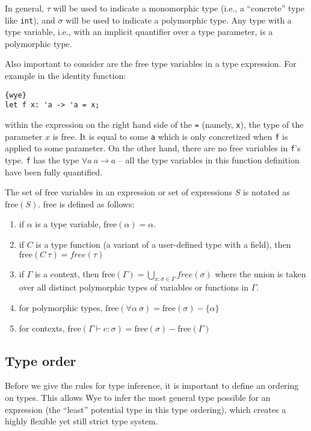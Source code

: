 \documentclass[a4paper, 12pt]{article}
\newcommand{\free}{\text{free}}
\begin{document}
In general, $\tau$ will be used to indicate a monomorphic type (i.e., a ``concrete'' type like \texttt{int}), and $\sigma$ will be used to indicate a polymorphic type. Any type with a type variable, i.e., with an implicit quantifier over a type parameter, is a polymorphic type.

Also important to consider are the free type variables in a type expression. For example in the identity function:
\begin{lstlisting}{wye}
let f x: 'a -> 'a = x;
\end{lstlisting}
within the expression on the right hand side of the \texttt{=} (namely, \texttt{x}), the type of the parameter $x$ is free. It is equal to some \texttt{a} which is only concretized when \texttt{f} is applied to some parameter. On the other hand, there are no free variables in \texttt{f}'s type. \texttt{f} has the type $\forall a\: a\to a$ -- all the type variables in this function definition have been fully quantified.

The set of free variables in an expression or set of expressions $S$ is notated as $\free(S)$. free is defined as follows:
\begin{enumerate}
\item if $\alpha$ is a type variable, $\free(\alpha) = \alpha$.
\item if $C$ is a type function (a variant of a user-defined type with a field), then $\free(C\: \tau) = free(\tau)$
\item if $\Gamma$ is a context, then $\free(\Gamma) = \bigcup_{x : \sigma\in\Gamma }free(\sigma)$ where the union is taken over all distinct polymorphic types of variables or functions in $\Gamma$.
\item for polymorphic types, $\free(\forall \alpha \: \sigma) = \free(\sigma) - \{\alpha\}$
\item for contexts, $\free(\Gamma\vdash e: \sigma) = \free(\sigma) - \free(\Gamma)$
\end{enumerate}

\subsection{Type order}

Before we give the rules for type inference, it is important to define an ordering on types. This allows Wye to infer the most general type possible for an expression (the ``least'' potential type in this type ordering), which creates a highly flexible yet still strict type system.
\end{document}
